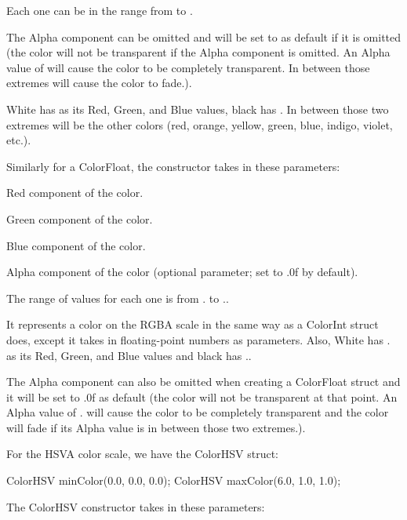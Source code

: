 Each one can be in the range from {} to {}.

The Alpha component can be omitted and will be set to {} as default if it is omitted (the color will not be transparent if the Alpha component is omitted. An Alpha value of {} will cause the color to be completely transparent. In between those extremes will cause the color to fade.).

White has {} as its Red, Green, and Blue values, black has {}. In between those two extremes will be the other colors (red, orange, yellow, green, blue, indigo, violet, etc.).

Similarly for a {\ttfamily Color\-Float}, the constructor takes in these parameters\-:


\begin{DoxyItemize}
\item Red component of the color.
\item Green component of the color.
\item Blue component of the color.
\item Alpha component of the color (optional parameter; set to {.\-0f} by default).
\end{DoxyItemize}

The range of values for each one is from {.} to {.}.

It represents a color on the R\-G\-B\-A scale in the same way as a {\ttfamily Color\-Int} struct does, except it takes in floating-\/point numbers as parameters. Also, White has {.} as its Red, Green, and Blue values and black has {.}.

The Alpha component can also be omitted when creating a {\ttfamily Color\-Float} struct and it will be set to {.\-0f} as default (the color will not be transparent at that point. An Alpha value of {.} will cause the color to be completely transparent and the color will fade if its Alpha value is in between those two extremes.).

For the H\-S\-V\-A color scale, we have the {\ttfamily Color\-H\-S\-V} struct\-:


\begin{DoxyCode}
ColorHSV minColor(0.0, 0.0, 0.0);
ColorHSV maxColor(6.0, 1.0, 1.0);
\end{DoxyCode}


The {\ttfamily Color\-H\-S\-V} constructor takes in these parameters\-:


